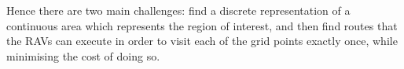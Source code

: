 Hence there are two main challenges: find a discrete representation of a continuous area which represents the region of interest, and then find routes that the RAVs can execute in order to visit each of the grid points exactly once, while minimising the cost of doing so.











